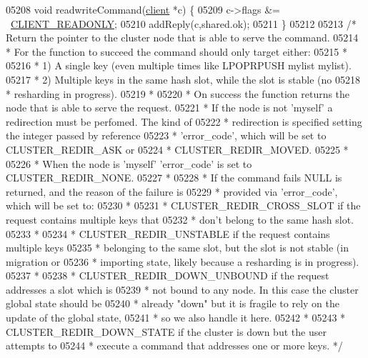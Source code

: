 \begin{DoxyCode}
{{{{{{{{{{{{{{{{{{{{{{{{{{{{{{{{{{{{{{{{{{{{{{{{{{{{{{{{{{{{{{{{{{{{{{{{{{{{{{{{{{{{{{{{{{{{{{{{{{{{{{{{{{{{{05208 \textcolor{keywordtype}{void} readwriteCommand(\hyperlink{structclient}{client} *c) \{
05209     c->flags &= ~\hyperlink{server_8h_a84ba0494755e2f4f0faf6017175b5e0a}{CLIENT\_READONLY};
05210     addReply(c,shared.ok);
05211 \}
05212 
05213 \textcolor{comment}{/* Return the pointer to the cluster node that is able to serve the command.}
05214 \textcolor{comment}{ * For the function to succeed the command should only target either:}
05215 \textcolor{comment}{ *}
05216 \textcolor{comment}{ * 1) A single key (even multiple times like LPOPRPUSH mylist mylist).}
05217 \textcolor{comment}{ * 2) Multiple keys in the same hash slot, while the slot is stable (no}
05218 \textcolor{comment}{ *    resharding in progress).}
05219 \textcolor{comment}{ *}
05220 \textcolor{comment}{ * On success the function returns the node that is able to serve the request.}
05221 \textcolor{comment}{ * If the node is not 'myself' a redirection must be perfomed. The kind of}
05222 \textcolor{comment}{ * redirection is specified setting the integer passed by reference}
05223 \textcolor{comment}{ * 'error\_code', which will be set to CLUSTER\_REDIR\_ASK or}
05224 \textcolor{comment}{ * CLUSTER\_REDIR\_MOVED.}
05225 \textcolor{comment}{ *}
05226 \textcolor{comment}{ * When the node is 'myself' 'error\_code' is set to CLUSTER\_REDIR\_NONE.}
05227 \textcolor{comment}{ *}
05228 \textcolor{comment}{ * If the command fails NULL is returned, and the reason of the failure is}
05229 \textcolor{comment}{ * provided via 'error\_code', which will be set to:}
05230 \textcolor{comment}{ *}
05231 \textcolor{comment}{ * CLUSTER\_REDIR\_CROSS\_SLOT if the request contains multiple keys that}
05232 \textcolor{comment}{ * don't belong to the same hash slot.}
05233 \textcolor{comment}{ *}
05234 \textcolor{comment}{ * CLUSTER\_REDIR\_UNSTABLE if the request contains multiple keys}
05235 \textcolor{comment}{ * belonging to the same slot, but the slot is not stable (in migration or}
05236 \textcolor{comment}{ * importing state, likely because a resharding is in progress).}
05237 \textcolor{comment}{ *}
05238 \textcolor{comment}{ * CLUSTER\_REDIR\_DOWN\_UNBOUND if the request addresses a slot which is}
05239 \textcolor{comment}{ * not bound to any node. In this case the cluster global state should be}
05240 \textcolor{comment}{ * already "down" but it is fragile to rely on the update of the global state,}
05241 \textcolor{comment}{ * so we also handle it here.}
05242 \textcolor{comment}{ *}
05243 \textcolor{comment}{ * CLUSTER\_REDIR\_DOWN\_STATE if the cluster is down but the user attempts to}
05244 \textcolor{comment}{ * execute a command that addresses one or more keys. */}
}}}}}}}}}}}}}}}}}}}}}}}}}}}}}}}}}}}}}}}}}}}}}}}}}}}}}}}}}}}}}}}}}}}}}}}}}}}}}}}}}}}}}}}}}}}}}}}}}}}}}}}}}}}}}
\end{DoxyCode}

